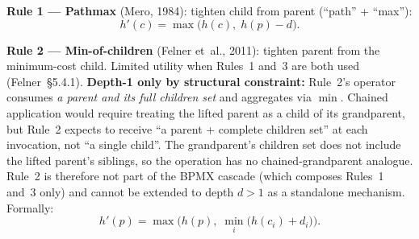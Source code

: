 \documentclass[11pt, a4paper]{article}
\begin{document}
\begin{sentences}
\item \textbf{Rule 1 --- Pathmax} (Mero, 1984): tighten
      child from parent (``path'' + ``max''):
      \[
          h'(c) = \max\bigl(h(c),\; h(p) - d\bigr).
      \]

      \begin{center}
      \end{center}

\item \textbf{Rule 2 --- Min-of-children}
      (Felner et~al., 2011): tighten parent from the
      minimum-cost child. Limited utility when Rules~1
      and~3 are both used (Felner~\S5.4.1).
      \textbf{Depth-1 only by structural constraint:}
      Rule~2's operator consumes \emph{a parent and its
      full children set} and aggregates via $\min$. Chained
      application would require treating the lifted parent
      as a child of its grandparent, but Rule~2 expects to
      receive ``a parent + complete children set'' at each
      invocation, not ``a single child''. The grandparent's
      children set does not include the lifted parent's
      siblings, so the operation has no chained-grandparent
      analogue. Rule~2 is therefore not part of the BPMX
      cascade (which composes Rules~1 and~3 only) and
      cannot be extended to depth $d > 1$ as a standalone
      mechanism. Formally:
      \[
          h'(p) = \max\bigl(h(p),\;
                  \min_{i}\bigl(h(c_i) + d_i\bigr)\bigr).
      \]

      \begin{center}
\end{center}
\end{sentences}
\end{document}
